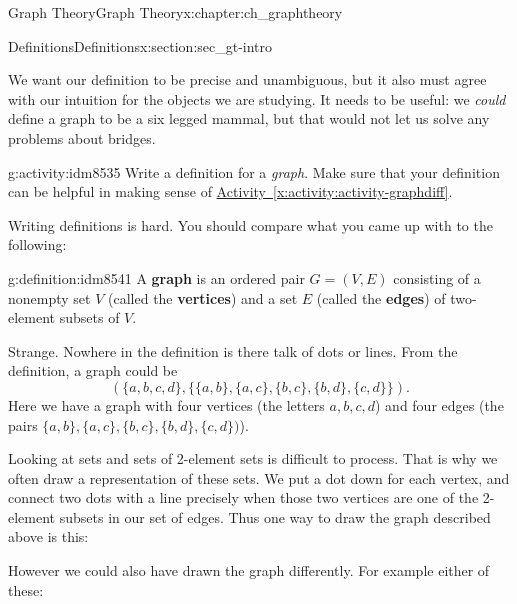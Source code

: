 \documentclass[oneside,10pt,]{book}
\newcommand{\terminology}[1]{\textbf{#1}}
\numberwithin{equation}{chapter}
\newcommand{\vtx}[2]{node[fill,circle,inner sep=0pt, minimum size=4pt,label=#1:#2]{}}
\newcommand{\vr}[1]{\vtx{right}{#1}}
\newcommand{\vl}[1]{\vtx{left}{#1}}
\begin{document}
\begin{chapterptx}{Graph Theory}{}{Graph Theory}{}{}{x:chapter:ch_graphtheory}
\begin{sectionptx}{Definitions}{}{Definitions}{}{}{x:section:sec_gt-intro}
\par
We want our definition to be precise and unambiguous, but it also must agree with our intuition for the objects we are studying.  It needs to be useful: we \emph{could} define a graph to be a six legged mammal, but that would not let us solve any problems about bridges.%
\begin{activity}{}{g:activity:idm8535}%
Write a definition for a \emph{graph}.  Make sure that your definition can be helpful in making sense of \hyperref[x:activity:activity-graphdiff]{Activity~\ref{x:activity:activity-graphdiff}}.%
\end{activity}
Writing definitions is hard.  You should compare what you came up with to the following:%
\begin{definition}{}{g:definition:idm8541}%
A \terminology{graph} is an ordered pair \(G = (V, E)\) consisting of a nonempty set \(V\) (called the \terminology{vertices}) and a set \(E\) (called the \terminology{edges}) of two-element subsets of \(V\).%
\end{definition}
Strange.  Nowhere in the definition is there talk of dots or lines.  From the definition, a graph could be%
\begin{equation*}
(\{a,b,c,d\}, \{\{a,b\}, \{a,c\}, \{b,c\}, \{b,d\}, \{c,d\}\}).
\end{equation*}
Here we have a graph with four vertices  (the letters \(a, b, c, d\)) and four edges (the pairs \(\{a,b\}, \{a,c\}, \{b,c\}, \{b,d\}, \{c,d\})\)).%
\par
Looking at sets and sets of 2-element sets is difficult to process.  That is why we often draw a representation of these sets.  We put a dot down for each vertex, and connect two dots with a line precisely when those two vertices are one of the 2-element subsets in our set of edges.  Thus one way to draw the graph described above is this:%
\begin{sidebyside}{1}{0.375}{0.375}{0}%
\begin{sbspanel}{0.25}%
\resizebox{\linewidth}{!}{%
\begin{tikzpicture}[scale=0.7]
   \draw  (-1,1) \vl{\(a\)} -- (1,1) \vr{\(b\)} (-1,1) -- (-1,-1) \vl{\(c\)} -- (1,-1) \vr{\(d\)} -- (1,1) -- (-1,-1);
 \end{tikzpicture}
}%
\end{sbspanel}%
\end{sidebyside}%
\par
However we could also have drawn the graph differently. For example either of these:%
\begin{sidebyside}{2}{0.1375}{0.1375}{0.275}%

\end{sidebyside}
\end{sectionptx}
\end{chapterptx}
\end{document}
